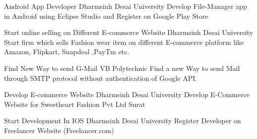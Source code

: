 \documentclass[]{cv-style}          %
\begin{document}
\begin{entrylist}
\entry
{}
{ Android App Developer}
{Dharmsinh Desai University}
{Develop File-Manager app in Android using Eclipse Studio and Register on Google Play Store}

\end{entrylist}
\begin{entrylist}
\entry
{}
{ Start online selling on Different E-commerce Website }
{Dharmsinh Desai University}
{Start firm which sells Fashion wear item on different E-commerce platform like Amazon, Flipkart, Snapdeal ,PayTm etc.}

\end{entrylist}


\begin{entrylist}
\entry
{}
{Find New Way to send G-Mail}
{VB Polytechnic}
{Find a new Way to send Mail through SMTP protocol without authentication of Google API.}

\end{entrylist}

\begin{entrylist}
\entry
{}
{Develop E-commerce Website }
{Dharmsinh Desai University}
{Develop E-Commerce Website for Sweetheart Fashion Pvt Ltd Surat}

\end{entrylist}

\begin{entrylist}
\entry
{}
{Start Development In IOS }
{Dharmsinh Desai University}
{Register Developer on Freelancer Website (Freelancer.com)}

\end{entrylist}\\\\\

\end{document}
